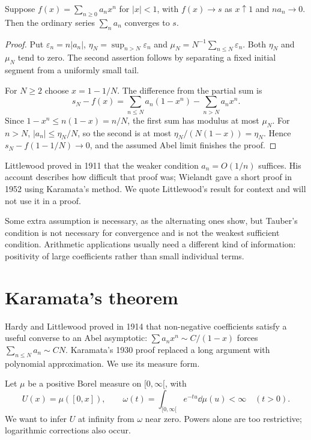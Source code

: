\begin{theorem}[Tauber, 1897]\label{thm:tauber}
Suppose $f(x)=\sum_{n\ge0}a_nx^n$ for $|x|<1$, with $f(x)\to s$ as $x\uparrow1$ and $na_n\to0$. Then the ordinary series $\sum_na_n$ converges to $s$.
\end{theorem}
\begin{proof}
Put $\varepsilon_n=n|a_n|$, $\eta_N=\sup_{n>N}\varepsilon_n$ and $\mu_N=N^{-1}\sum_{n\le N}\varepsilon_n$. Both $\eta_N$ and $\mu_N$ tend to zero. The second assertion follows by separating a fixed initial segment from a uniformly small tail.

For $N\ge2$ choose $x=1-1/N$. The difference from the partial sum is
\[s_N-f(x)=\sum_{n\le N}a_n(1-x^n)-\sum_{n>N}a_nx^n.
\]
Since $1-x^n\le n(1-x)=n/N$, the first sum has modulus at most $\mu_N$. For $n>N$, $|a_n|\le\eta_N/N$, so the second is at most $\eta_N/(N(1-x))=\eta_N$. Hence $s_N-f(1-1/N)\to0$, and the assumed Abel limit finishes the proof.
\end{proof}

\begin{remark}
Littlewood proved in 1911 that the weaker condition $a_n=O(1/n)$ suffices. His account describes how difficult that proof was; Wielandt gave a short proof in 1952 using Karamata's method. We quote Littlewood's result for context and will not use it in a proof.
\end{remark}
\begin{remark}
Some extra assumption is necessary, as the alternating ones show, but Tauber's condition is not necessary for convergence and is not the weakest sufficient condition. Arithmetic applications usually need a different kind of information: positivity of large coefficients rather than small individual terms.
\end{remark}

\section{Karamata's theorem}

Hardy and Littlewood proved in 1914 that non-negative coefficients satisfy a useful converse to an Abel asymptotic: $\sum a_nx^n\sim C/(1-x)$ forces $\sum_{n\le N}a_n\sim CN$. Karamata's 1930 proof replaced a long argument with polynomial approximation. We use its measure form.

Let $\mu$ be a positive Borel measure on $[0,\infty[$, with
\[U(x)=\mu([0,x]),\qquad\omega(t)=\int_{[0,\infty[}e^{-tu}\dd\mu(u)<\infty\quad(t>0).
\]
We want to infer $U$ at infinity from $\omega$ near zero. Powers alone are too restrictive; logarithmic corrections also occur.

